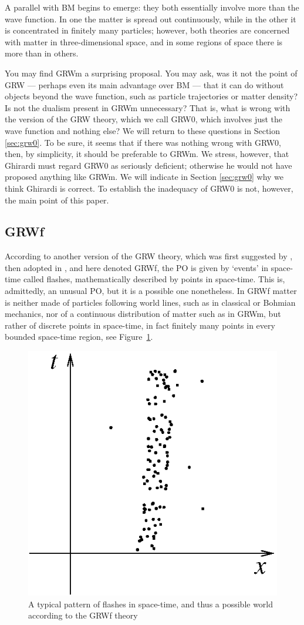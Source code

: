 \documentclass[12pt]{article}
\begin{document}
A parallel with {\sf BM} begins to emerge: 
they both essentially involve more than the wave function. 
In one the matter is spread out continuously, while in the other it is
concentrated in finitely many particles; however, both theories are concerned with matter in three-dimensional space, and in some regions of space there is more than in others.

You may find {\sf GRWm} a surprising proposal. You may ask, was it not the
point of {\sf GRW} --- perhaps even its main advantage over {\sf BM} ---
that it can do without objects beyond the wave function, such as particle
trajectories or matter density? Is not the dualism present in {\sf GRWm}
unnecessary? That is, what is wrong with the version of the {\sf GRW}
theory, which we call {\sf GRW0}, which involves just the wave function and
nothing else? We will return to these questions in Section
\ref{sec:grw0}. To be sure, it seems that if there was nothing wrong with
{\sf GRW0}, then, by simplicity, it should be preferable to {\sf GRWm}. We
stress, however, that Ghirardi must regard {\sf GRW0} as seriously
deficient; otherwise he would not have proposed anything like {\sf GRWm}.
We will indicate in Section \ref{sec:grw0} why we think Ghirardi is
correct. To establish the inadequacy of {\sf GRW0} is not, however, the
main point of this paper.

\subsection{GRWf}
\label{sec:GRWf}
According to another version of the {\sf GRW} theory, which was
first suggested by \citet{Bell87,Bell89}, then adopted in \citep{kent,Gol98,Tum04,Tum05,AZ05,Mau05},
and here denoted {\sf GRWf}, the PO is given by `events' in space-time called flashes, mathematically
described by points in space-time. 
This is, admittedly, an unusual PO, but it is a possible
one nonetheless. In {\sf GRWf} matter is neither made of particles following world
lines, such as in classical or Bohmian mechanics, nor of a continuous
distribution of matter such as in {\sf GRWm}, but rather of discrete points
in space-time, in fact finitely many points in every bounded space-time
region, see Figure~\ref{flashes}. 

\begin{figure}[ht]\begin{center}\includegraphics[width=.4 \textwidth]
{flashes.eps}\end{center}\caption{A typical pattern of flashes in space-time, and thus a possible   
world according to the {\sf GRWf} theory}\label{flashes}\end{figure}
\end{document}
